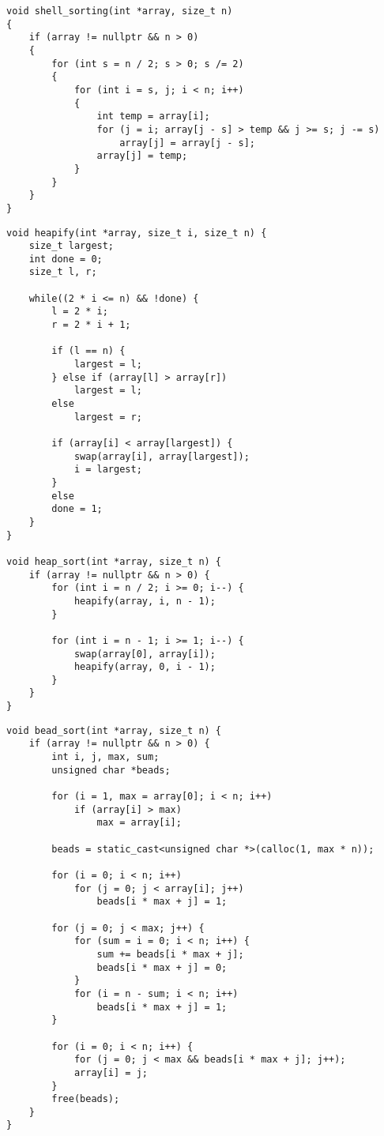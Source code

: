 \begin{lstlisting}[label=lst:shell,caption=Функция сортировки методом Шелла]
void shell_sorting(int *array, size_t n)
{
	if (array != nullptr && n > 0)
	{
		for (int s = n / 2; s > 0; s /= 2)
		{
			for (int i = s, j; i < n; i++)
			{
				int temp = array[i];
				for (j = i; array[j - s] > temp && j >= s; j -= s)
					array[j] = array[j - s];
				array[j] = temp;
			}
		}
	}
}
\end{lstlisting}

\clearpage

\begin{lstlisting}[label=lst:heap,caption=Функция пирамидальной сортировки]
void heapify(int *array, size_t i, size_t n) {
	size_t largest;
	int done = 0;
	size_t l, r;
	
	while((2 * i <= n) && !done) {
		l = 2 * i;
		r = 2 * i + 1;
		
		if (l == n) {
			largest = l;
		} else if (array[l] > array[r])
			largest = l;
		else
			largest = r;
		
		if (array[i] < array[largest]) {
			swap(array[i], array[largest]);
			i = largest;
		}
		else
		done = 1;
	}
}

void heap_sort(int *array, size_t n) {
	if (array != nullptr && n > 0) {
		for (int i = n / 2; i >= 0; i--) {
			heapify(array, i, n - 1);
		}
		
		for (int i = n - 1; i >= 1; i--) {
			swap(array[0], array[i]);
			heapify(array, 0, i - 1);
		}
	}
}
\end{lstlisting}

\clearpage

\begin{lstlisting}[label=lst:bead,caption=Функция сортировки бусинами]
void bead_sort(int *array, size_t n) {
	if (array != nullptr && n > 0) {
		int i, j, max, sum;
		unsigned char *beads;
		
		for (i = 1, max = array[0]; i < n; i++)
			if (array[i] > max)
				max = array[i];
		
		beads = static_cast<unsigned char *>(calloc(1, max * n));
		
		for (i = 0; i < n; i++)
			for (j = 0; j < array[i]; j++)
				beads[i * max + j] = 1;
		
		for (j = 0; j < max; j++) {
			for (sum = i = 0; i < n; i++) {
				sum += beads[i * max + j];
				beads[i * max + j] = 0;
			}
			for (i = n - sum; i < n; i++)
				beads[i * max + j] = 1;
		}
		
		for (i = 0; i < n; i++) {
			for (j = 0; j < max && beads[i * max + j]; j++);
			array[i] = j;
		}
		free(beads);
	}
}
\end{lstlisting}

